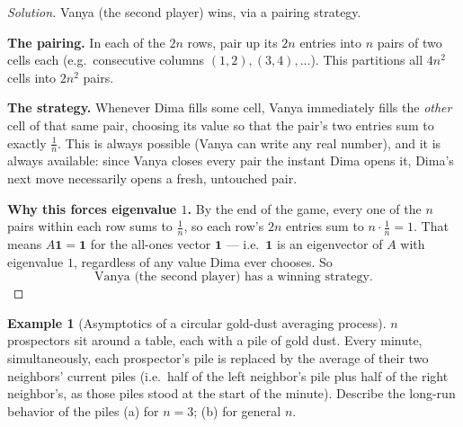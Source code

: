 \documentclass[11pt]{article}
\theoremstyle{definition}
\newtheorem{example}{Example}[section]
\begin{document}
\begin{proof}[Solution]
Vanya (the second player) wins, via a pairing strategy.

\textbf{The pairing.} In each of the $2n$ rows, pair up its $2n$ entries into $n$ pairs of two cells each (e.g.\ consecutive columns $(1,2),(3,4),\dots$). This partitions all $4n^2$ cells into $2n^2$ pairs.

\textbf{The strategy.} Whenever Dima fills some cell, Vanya immediately fills the \emph{other} cell of that same pair, choosing its value so that the pair's two entries sum to exactly $\tfrac1n$. This is always possible (Vanya can write any real number), and it is always available: since Vanya closes every pair the instant Dima opens it, Dima's next move necessarily opens a fresh, untouched pair.

\textbf{Why this forces eigenvalue $1$.} By the end of the game, every one of the $n$ pairs within each row sums to $\tfrac1n$, so each row's $2n$ entries sum to $n\cdot\tfrac1n=1$. That means $A\mathbf 1=\mathbf 1$ for the all-ones vector $\mathbf1$ — i.e.\ $\mathbf1$ is an eigenvector of $A$ with eigenvalue $1$, regardless of any value Dima ever chooses. So
\[
\boxed{\text{Vanya (the second player) has a winning strategy}}.
\]
\end{proof}

\begin{example}[Asymptotics of a circular gold-dust averaging process]
$n$ prospectors sit around a table, each with a pile of gold dust. Every minute, simultaneously, each prospector's pile is replaced by the average of their two neighbors' current piles (i.e.\ half of the left neighbor's pile plus half of the right neighbor's, as those piles stood at the start of the minute). Describe the long-run behavior of the piles (a) for $n=3$; (b) for general $n$.
\end{example}
\end{document}
